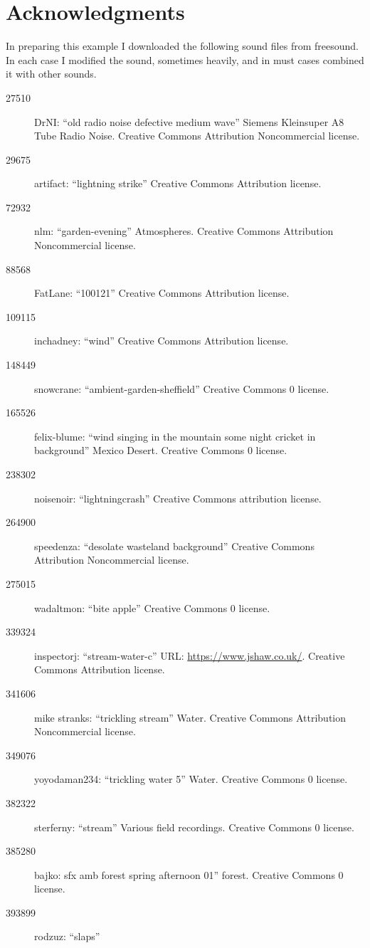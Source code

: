 \documentclass[letterpaper,twoside]{article}
\begin{document}
\section{Acknowledgments}

In preparing this example I downloaded the following sound files
from freesound.  In each case I modified the sound, sometimes heavily,
and in must cases combined it with other sounds.

\begin{description}
\item[27510]DrNI: ``old radio noise defective medium wave''
  Siemens Kleinsuper A8 Tube Radio Noise.  Creative Commons
  Attribution Noncommercial license.
\item[29675]artifact: ``lightning strike''
  Creative Commons Attribution license.
\item[72932]nlm: ``garden-evening''
  Atmospheres.  Creative Commons
  Attribution Noncommercial license.
\item[88568]FatLane: ``100121''
  Creative Commons Attribution license.
\item[109115]inchadney: ``wind''
  Creative Commons Attribution license.
\item[148449]snowcrane: ``ambient-garden-sheffield''
  Creative Commons 0 license.
\item[165526]felix-blume: ``wind singing in the mountain some night
  cricket in background''
  Mexico Desert.  Creative Commons 0 license.
\item[238302]noisenoir: ``lightningcrash''
  Creative Commons attribution license.
\item[264900]speedenza: ``desolate wasteland background''
  Creative Commons Attribution Noncommercial license.
\item[275015]wadaltmon: ``bite apple''
  Creative Commons 0 license.
\item[339324]inspectorj: ``stream-water-c''
  URL: \url{https://www.jshaw.co.uk/}.
  Creative Commons Attribution license.
\item[341606]mike stranks: ``trickling stream''
  Water.  Creative Commons Attribution Noncommercial license.
\item[349076]yoyodaman234: ``trickling water 5''
  Water.  Creative Commons 0 license.
\item[382322]sterferny: ``stream''
  Various field recordings.  Creative Commons 0 license.
\item[385280]bajko: sfx amb forest spring afternoon 01''
  forest.  Creative Commons 0 license.
\item[393899]rodzuz: ``slaps''

\end{description}
\end{document}
